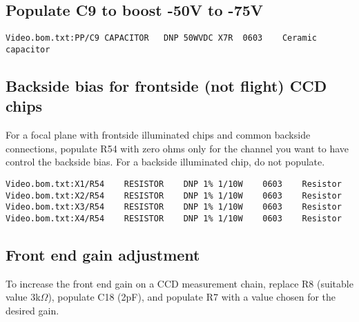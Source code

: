 \documentclass[11pt]{article}
\begin{document}
\subsection{Populate C9 to boost -50V to -75V}
\begin{verbatim}
Video.bom.txt:PP/C9	CAPACITOR	DNP	50WVDC X7R	0603	Ceramic capacitor	
\end{verbatim}

\subsection{Backside bias for frontside (not flight) CCD chips}
For a focal plane with frontside illuminated chips and 
common backside connections, populate R54 with zero
ohms only for the channel you want to have
control the backside bias. For a backside illuminated
chip, do not populate.
\begin{verbatim}
Video.bom.txt:X1/R54	RESISTOR	DNP	1% 1/10W	0603	Resistor	
Video.bom.txt:X2/R54	RESISTOR	DNP	1% 1/10W	0603	Resistor	
Video.bom.txt:X3/R54	RESISTOR	DNP	1% 1/10W	0603	Resistor	
Video.bom.txt:X4/R54	RESISTOR	DNP	1% 1/10W	0603	Resistor	
\end{verbatim}

\subsection{Front end gain adjustment}

To increase the front end gain on a CCD measurement chain, replace R8 (suitable value 3k$\Omega$), populate C18 (2pF), and populate R7 with a value chosen for the desired gain.
\end{document}
